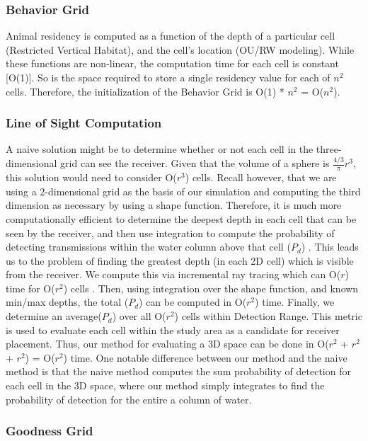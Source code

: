\subsubsection{Behavior Grid}
Animal residency is computed as a function of the depth of a particular cell (Restricted Vertical Habitat), and the cell's location (OU/RW modeling).  While these functions are non-linear, the computation time for each cell is constant [O(1)].  So is the space required to store a single residency value for each of $n^2$ cells.  Therefore, the initialization of the Behavior Grid is O(1) * $n^2$ = O($n^2$).


\subsubsection{Line of Sight Computation}
A naive solution might be to determine whether or not each cell in the three-dimensional grid can see the receiver.  Given that the volume of a sphere is $\frac{4/3}\pi r^{3}$, this solution would need to consider O($r^{3}$) cells.  Recall however, that we are using a 2-dimensional grid as the basis of our simulation and computing the third dimension as necessary by using a shape function.  Therefore, it is much more computationally efficient to determine the deepest depth in each cell that can be seen by the receiver, and then use integration to compute the probability of detecting transmissions within the water column above that cell ($P_{d}$) .  This leads us to the problem of finding the greatest depth (in each 2D cell) which is visible from the receiver.  We compute this via incremental ray tracing which can  O($r$) time for O($r^{2}$) cells \cite{Akbarzadeh2013}.   Then, using integration over the shape function, and known min/max depths, the total ($P_{d}$) can be computed in O($r^{2}$) time.  Finally, we determine an average($P_{d}$)  over all O($r^{2}$) cells within Detection Range.  This metric is used to evaluate each cell within the study area as a candidate for receiver placement.  Thus, our method for evaluating a 3D space can be done in  O($r^{2}$ + $r^{2}$ + $r^{2}$) = O($r^{2}$) time.  One notable difference between our method and the naive method is that the naive method computes the sum probability of detection for each cell in the 3D space, where our method simply integrates to find the probability of detection for the entire a column of water.  

\subsubsection{Goodness Grid}

